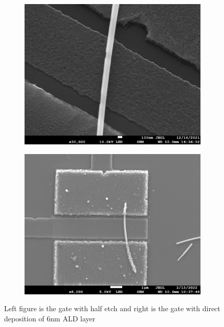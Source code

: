 \begin{figure}[h!]
    \centering
    \begin{subfigure}[b]{0.45\textwidth}
         \centering
         \includegraphics[width=\textwidth]{Pic/Gatehalfetch.jpg}
         \caption{}
         \label{halfetchgate}
     \end{subfigure}
     \hfill
     \begin{subfigure}[b]{0.45\textwidth}
         \centering
         \includegraphics[width=\textwidth]{Pic/ALDlayer.jpg}
         \caption{}
         \label{fig:three sin x}
     \end{subfigure}
    \caption{Left figure is the gate with half etch and right is the gate with direct deposition of 6nm ALD layer}
    \label{ALDgate}
\end{figure}

